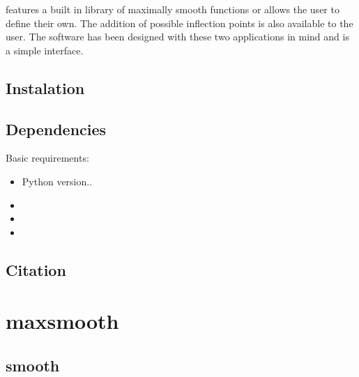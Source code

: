 \documentclass[letterpaper,10pt,english]{sphinxmanual}
\begin{document}
 features a built in library of maximally smooth functions or
allows the user to define their own. The addition of possible inflection points
is also available to the user. The software has been designed with these two
applications in mind and is a simple interface.


\section{Instalation}
\label{\detokenize{source/intro:instalation}}

\section{Dependencies}
\label{\detokenize{source/intro:dependencies}}
Basic requirements:
\begin{itemize}
\item {} 
Python version..

\item {} 

\item {} 

\item {} 

\end{itemize}


\section{Citation}
\label{\detokenize{source/intro:citation}}

\chapter{maxsmooth}
\label{\detokenize{source/maxsmooth:maxsmooth}}\label{\detokenize{source/maxsmooth::doc}}

\section{smooth}
\label{\detokenize{source/maxsmooth:module-maxsmooth.msf}}\label{\detokenize{source/maxsmooth:smooth}}
\end{document}

